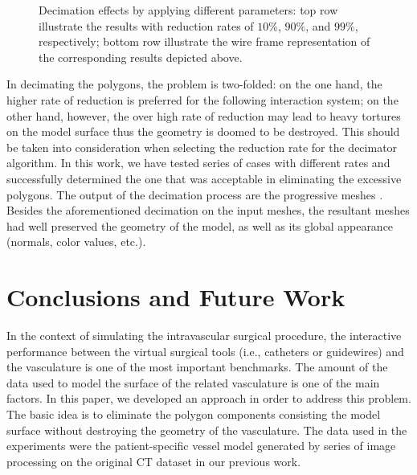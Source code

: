 \begin{figure}[t]
{\label{fig:Decimate90-w}}
\hfil
{}
\caption{Decimation effects by applying different parameters: top row illustrate the results with reduction rates of $10\%$, $90\%$, and $99\%$, respectively; bottom row illustrate the wire frame representation of the corresponding results depicted above.}%
\label{fig:Decimate}
\end{figure}

In decimating the polygons, the problem is two-folded: on the one hand, the higher rate of reduction is preferred for the following interaction system; on the other hand, however, the over high rate of reduction may lead to heavy tortures on the model surface thus the geometry is doomed to be destroyed. %
This should be taken into consideration when selecting the reduction rate for the decimator algorithm.
In this work, we have tested series of cases with different rates and successfully determined the one that was acceptable in eliminating the excessive polygons.
The output of the decimation process are the progressive meshes \cite{Hoppe1996}.
Besides the aforementioned decimation on the input meshes, the resultant meshes had well preserved the geometry of the model, as well as its global appearance (normals, color values, etc.). %

\section{Conclusions and Future Work}

In the context of simulating the intravascular surgical procedure, the interactive performance between the virtual surgical tools (i.e., catheters or guidewires) and the vasculature is one of the most important benchmarks. %
The amount of the data used to model the surface of the related vasculature is one of the main factors.
In this paper, we developed an approach in order to address this problem.
The basic idea is to eliminate the polygon components consisting the model surface without destroying the geometry of the vasculature.
The data used in the experiments were the patient-specific vessel model generated by series of image processing on the original CT dataset in our previous work.

